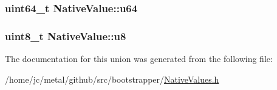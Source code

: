 \subsubsection[{u64}]{\setlength{\rightskip}{0pt plus 5cm}uint64\+\_\+t Native\+Value\+::u64}\label{unionNativeValue_a4c6ef6c5f3ffdd7b7a662304bef89d4c}
\hypertarget{unionNativeValue_a828b63673532c2c53493f96453b3826f}{}
\subsubsection[{u8}]{\setlength{\rightskip}{0pt plus 5cm}uint8\+\_\+t Native\+Value\+::u8}\label{unionNativeValue_a828b63673532c2c53493f96453b3826f}


The documentation for this union was generated from the following file\+:\begin{DoxyCompactItemize}
\item 
/home/jc/metal/github/src/bootstrapper/\hyperlink{NativeValues_8h}{Native\+Values.\+h}\end{DoxyCompactItemize}
